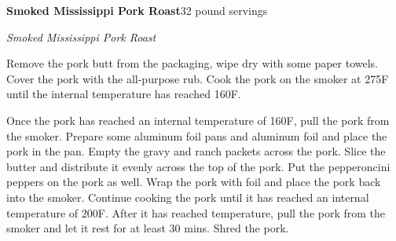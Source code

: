 \documentclass[../recipe-collections/cooking.tex]{subfiles}
\begin{document}
\begin{recipe}{\textbf{Smoked Mississippi Pork Roast}}{32  pound servings}{}

  \freeform{}\textit{Smoked Mississippi Pork Roast}


  Remove the pork butt from the packaging, wipe dry with some paper towels.
  Cover the pork with the all-purpose rub. Cook the pork on the smoker at 275F
  until the internal temperature has reached 160F.


  Once the pork has reached an internal temperature of 160F, pull the pork
  from the smoker. Prepare some aluminum foil pans and aluminum foil and 
  place the pork in the pan. Empty the gravy and ranch packets across the pork.
  Slice the butter and distribute it evenly across the top of the pork. Put the 
  pepperoncini peppers on the pork as well. Wrap the pork with foil and place
  the pork back into the smoker. Continue cooking the pork until it has reached
  an internal temperature of 200F. After it has reached temperature, pull the pork
  from the smoker and let it rest for at least 30 mins. Shred the pork.


\end{recipe}
\end{document}
